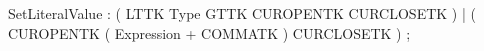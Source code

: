 %
%
%
\begin{rail}
SetLiteralValue : ( LTTK Type GTTK CUROPENTK CURCLOSETK )
                | ( CUROPENTK ( Expression + COMMATK ) CURCLOSETK )
                ;
\end{rail}
